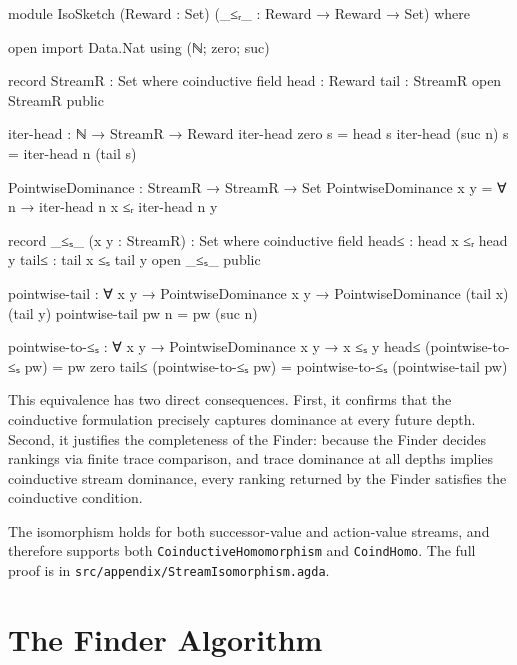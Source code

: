 \documentclass[runningheads]{llncs}
\newcommand{\fpath}[1]{\nolinkurl{#1}}
\begin{document}
\begin{code}[hide]
module IsoSketch
  (Reward : Set)
  (_≤ᵣ_ : Reward → Reward → Set)
  where
  
  open import Data.Nat using (ℕ; zero; suc)
  
  record StreamR : Set where
    coinductive
    field head : Reward
          tail : StreamR
  open StreamR public
  
  iter-head : ℕ → StreamR → Reward
  iter-head zero s = head s
  iter-head (suc n) s = iter-head n (tail s)
  
  PointwiseDominance : StreamR → StreamR → Set
  PointwiseDominance x y = ∀ n → iter-head n x ≤ᵣ iter-head n y

  record _≤ₛ_ (x y : StreamR) : Set where
    coinductive
    field head≤ : head x ≤ᵣ head y
          tail≤ : tail x ≤ₛ tail y
  open _≤ₛ_ public
  
  pointwise-tail : ∀ {x y} → PointwiseDominance x y → PointwiseDominance (tail x) (tail y)
  pointwise-tail pw n = pw (suc n)
\end{code}

\begin{code}[hide]
  pointwise-to-≤ₛ : ∀ {x y} → PointwiseDominance x y → x ≤ₛ y
  head≤ (pointwise-to-≤ₛ pw) = pw zero
  tail≤ (pointwise-to-≤ₛ pw) = pointwise-to-≤ₛ (pointwise-tail pw)
\end{code}

This equivalence has two direct consequences.  First, it confirms that the coinductive formulation precisely captures dominance at every future depth.  Second, it justifies the completeness of the Finder: because the Finder decides rankings via finite trace comparison, and trace dominance at all depths implies coinductive stream dominance, every ranking returned by the Finder satisfies the coinductive condition.

The isomorphism holds for both successor-value and action-value streams, and therefore supports both \texttt{CoinductiveHomomorphism} and \texttt{CoindHomo}.  The full proof is in \fpath{src/appendix/StreamIsomorphism.agda}.


\section{The Finder Algorithm}\label{sec:finder}
\end{document}
